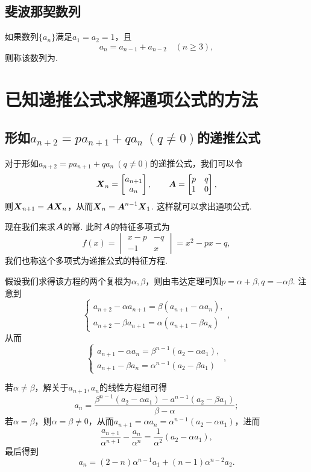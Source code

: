 \subsection{斐波那契数列}
如果数列\(\{a_n\}\)满足\(a_1=a_2=1\)，且\[
a_n = a_{n-1} + a_{n-2} \quad(n\geqslant3),
\]则称该数列为.

\section{已知递推公式求解通项公式的方法}
\subsection{\texorpdfstring{形如\(a_{n+2}=p a_{n+1} + q a_n\ (q\neq0)\)的递推公式}{第一类递推公式}}
对于形如\(a_{n+2}=p a_{n+1} + q a_n\ (q\neq0)\)的递推公式，我们可以令\[
\boldsymbol{X}_n = \begin{bmatrix}
a_{n+1} \\
a_n
\end{bmatrix},
\qquad
\boldsymbol{A} = \begin{bmatrix}
p & q \\
1 & 0
\end{bmatrix},
\]则\(\boldsymbol{X}_{n+1} = \boldsymbol{A} \boldsymbol{X}_n\)，从而\(\boldsymbol{X}_n = \boldsymbol{A}^{n-1} \boldsymbol{X}_1\).
这样就可以求出通项公式.

现在我们来求\(\boldsymbol{A}\)的幂.
此时\(\boldsymbol{A}\)的特征多项式为\[
f(x) = \begin{vmatrix}
x-p & -q \\
-1 & x
\end{vmatrix} = x^2 - px - q,
\]我们也称这个多项式为递推公式的特征方程.

假设我们求得该方程的两个复根为\(\alpha,\beta\)，则由韦达定理可知\(p=\alpha+\beta, q=-\alpha\beta\).
注意到\[
\left\{ \begin{array}{l}
a_{n+2} - \alpha a_{n+1} = \beta(a_{n+1}-\alpha a_n), \\
a_{n+2} - \beta a_{n+1} = \alpha(a_{n+1}-\beta a_n)
\end{array} \right.,
\]从而\[
\left\{ \begin{array}{l}
a_{n+1} - \alpha a_n = \beta^{n-1} (a_2 - \alpha a_1), \\
a_{n+1} - \beta a_n = \alpha^{n-1} (a_2 - \beta a_1)
\end{array} \right.,
\]

若\(\alpha\neq\beta\)，解关于\(a_{n+1},a_n\)的线性方程组可得\[
a_n = \frac{\beta^{n-1} (a_2 - \alpha a_1) - a^{n-1} (a_2 - \beta a_1)}{\beta-\alpha};
\]
若\(\alpha=\beta\)，则\(\alpha=\beta\neq0\)，从而\(a_{n+1} = \alpha a_n = \alpha^{n-1} (a_2 - \alpha a_1)\)，进而\[
\frac{a_{n+1}}{\alpha^{n+1}} - \frac{a_n}{\alpha^n} = \frac{1}{\alpha^2}(a_2-\alpha a_1),
\]最后得到\[
a_n = (2-n)\alpha^{n-1} a_1 + (n-1) \alpha^{n-2} a_2.
\]

